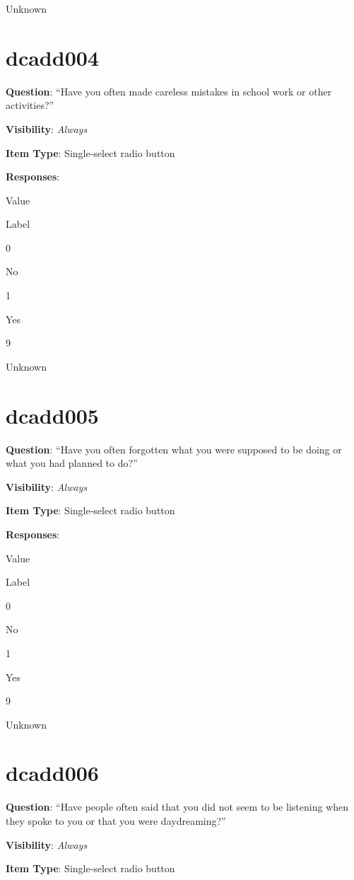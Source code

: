\documentclass[]{book}
\begin{document}
Unknown

\hypertarget{dcadd004}{%
\section{dcadd004}\label{dcadd004}}

\textbf{Question}: ``Have you often made careless mistakes in school work or other activities?''

\textbf{Visibility}: \emph{Always}

\textbf{Item Type}: Single-select radio button

\textbf{Responses}:

Value

Label

0

No

1

Yes

9

Unknown

\hypertarget{dcadd005}{%
\section{dcadd005}\label{dcadd005}}

\textbf{Question}: ``Have you often forgotten what you were supposed to be doing or what you had planned to do?''

\textbf{Visibility}: \emph{Always}

\textbf{Item Type}: Single-select radio button

\textbf{Responses}:

Value

Label

0

No

1

Yes

9

Unknown

\hypertarget{dcadd006}{%
\section{dcadd006}\label{dcadd006}}

\textbf{Question}: ``Have people often said that you did not seem to be listening when they spoke to you or that you were daydreaming?''

\textbf{Visibility}: \emph{Always}

\textbf{Item Type}: Single-select radio button
\end{document}
